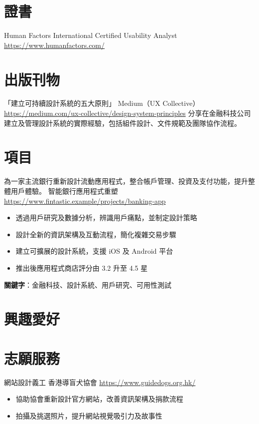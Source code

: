 \documentclass[a4paper, serif, 10pt]{moderncv}
\begin{document}
\section{證書}

        {Human Factors International}
        {Certified Usability Analyst}
        {\url{https://www.humanfactors.com/}}
        {}
        {}
\section{出版刊物}

        {「建立可持續設計系統的五大原則」}
        {Medium（UX Collective）}
        {\url{https://medium.com/ux-collective/design-system-principles}}
        {}
        {分享在金融科技公司建立及管理設計系統的實際經驗，包括組件設計、文件規範及團隊協作流程。}
\section{項目}

        {為一家主流銀行重新設計流動應用程式，整合帳戶管理、投資及支付功能，提升整體用戶體驗。
}
        {智能銀行應用程式重塑}
        {\url{https://www.fintastic.example/projects/banking-app}}
        {}
        {\begin{itemize}
\item 透過用戶研究及數據分析，辨識用戶痛點，並制定設計策略
\item 設計全新的資訊架構及互動流程，簡化複雜交易步驟
\item 建立可擴展的設計系統，支援 iOS 及 Android 平台
\item 推出後應用程式商店評分由 3.2 升至 4.5 星
\end{itemize}
\textbf{關鍵字}：金融科技、設計系統、用戶研究、可用性測試}
\section{興趣愛好}

\section{志願服務}

        {網站設計義工}
        {香港導盲犬協會}
        {\url{https://www.guidedogs.org.hk/}}
        {}
        {\begin{itemize}
\item 協助協會重新設計官方網站，改善資訊架構及捐款流程
\item 拍攝及挑選照片，提升網站視覺吸引力及故事性
\end{itemize}}
\end{document}
